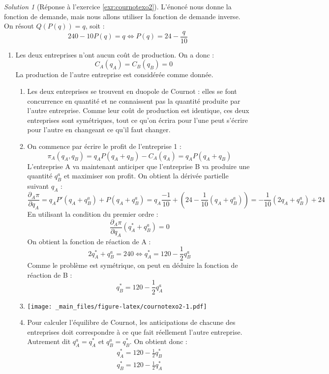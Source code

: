 \documentclass[
]{book}
\providecommand{\tightlist}{%
  \setlength{\itemsep}{0pt}\setlength{\parskip}{0pt}}
\theoremstyle{definition}
\theoremstyle{definition}
\theoremstyle{definition}
\theoremstyle{definition}
\theoremstyle{remark}
\newtheorem*{solution}{Solution}
\begin{document}
\begin{solution}[Réponse à l'exercice \ref{exr:cournotexo2}]

L'énoncé nous donne la fonction de demande, mais nous allons utiliser la fonction de demande inverse.
On résout \(Q(P(q))=q\), soit :
\[240-10P(q)=q\Leftrightarrow P(q)=24-\frac{q}{10}\]

\begin{enumerate}
\def\labelenumi{\arabic{enumi}.}
\tightlist
\item
  Les deux entreprises n'ont aucun coût de production.
  On a donc :
  \[C_{A}(q_A)=C_{B}(q_B)=0\]
  La production de l'autre entreprise est considérée comme donnée.

  \begin{enumerate}
  \def\labelenumii{\alph{enumii}.}
  \tightlist
  \item
    Les deux entreprises se trouvent en duopole de Cournot : elles se font concurrence en quantité et ne connaissent pas la quantité produite par l'autre entreprise.
    Comme leur coût de production est identique, ces deux entreprises sont symétriques, tout ce qu'on écrira pour l'une peut s'écrire pour l'autre en changeant ce qu'il faut changer.
  \item
    On commence par écrire le profit de l'entreprise 1 :
    \[\pi_A(q_A, q_B)=q_AP(q_A+q_B)-C_A(q_A)=q_AP(q_A+q_B)\]
    L'entreprise A va maintenant anticiper que l'entreprise B va produire une quantité \(q_B^a\) et maximiser son profit.
    On obtient la dérivée partielle suivant \(q_A\) :
    \[\frac{\partial_A\pi}{\partial q_A}=q_AP'(q_A+q_B^a)+P(q_A+q_B^a)=q_A\frac{-1}{10}+(24-\frac{1}{10}(q_A+q_B^a))=-\frac{1}{10}(2q_A+q_B^a)+24\]
    En utilisant la condition du premier ordre :
    \[\frac{\partial_A\pi}{\partial q_A}(q_A^*+q_B^a)=0\]
    On obtient la fonction de réaction de A :
    \[2q_A^*+q_B^a=240\Leftrightarrow q_A^*=120-\frac{1}{2}q_B^a\]
    Comme le problème est symétrique, on peut en déduire la fonction de réaction de B :
    \[q_B^*=120-\frac{1}{2}q_A^a\]
  \item
    \texttt{[image: \_main\_files/figure-latex/cournotexo2-1.pdf]}
  \item
    Pour calculer l'équilibre de Cournot, les anticipations de chacune des entreprises doit correspondre à ce que fait réellement l'autre entreprise.
    Autrement dit \(q_A^a=q_A^*\) et \(q_B^a=q_B^*\).
    On obtient donc :
    \begin{gather*}
    q_A^*=120-\frac{1}{2}q_B^*\\
    q_B^*=120-\frac{1}{2}q_A^*

\end{gather*}
\end{enumerate}
\end{enumerate}
\end{solution}
\end{document}
